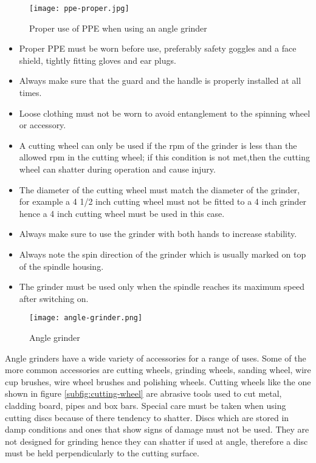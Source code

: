 \documentclass[a4paper,12pt]{article}
\begin{document}
			            \begin{figure}[H]
							\centering				
							\texttt{[image: ppe-proper.jpg]}	
							\caption{Proper use of PPE when using an angle grinder}
							\label{fig:angle-grinder-ppe}
						\end{figure}
			            
			            \begin{itemize}
							\item Proper PPE must be worn before use, preferably safety goggles and a face shield, tightly fitting gloves and ear plugs.
							\item Always make sure that the guard and the handle is properly installed at all times.
							\item Loose clothing must not be worn to avoid entanglement to the spinning wheel or accessory.
							\item A cutting wheel can only be used if the rpm of the grinder is less than the allowed rpm in the cutting wheel; if this condition is not met,then the cutting wheel can shatter during operation and cause injury. 
							\item The diameter of the cutting wheel must match the diameter of the grinder, for example a 4 1/2 inch cutting wheel must not be fitted to a 4 inch grinder hence a 4 inch cutting wheel must be used in this case.
							\item Always make sure to use the grinder with both hands to increase stability.
							\item Always note the spin direction of the grinder which is usually marked on top of the spindle housing.
							\item The grinder must be used only when the spindle reaches its maximum speed after switching on.
							   	 			            	
			            \end{itemize}		
						 
						\begin{figure}[H]
							\centering				
							\texttt{[image: angle-grinder.png]}	
							\caption{Angle grinder}
							\label{fig:angle-grinder}
						\end{figure}
						
						Angle grinders have a wide variety of accessories for a range of uses.
						Some of the more common accessories are cutting wheels, grinding wheels, sanding wheel, wire cup brushes, wire wheel brushes and polishing wheels.
						Cutting wheels like the one shown in figure \ref{subfig:cutting-wheel} are abrasive tools used to cut metal, cladding board, pipes and box bars.
						Special care must be taken when using cutting discs because of there tendency to shatter.
						Discs which are stored in damp conditions and ones that show signs of damage must not be used.
						They are not designed for grinding hence they can shatter if used at angle, therefore a disc must be held perpendicularly to the cutting surface. 
						
\end{document}
